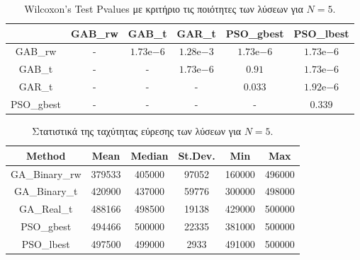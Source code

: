 \documentclass[12pt, a4paper]{article}
\newcommand{\en}{\selectlanguage{english}}
\newcommand{\gr}{\selectlanguage{greek}}
\begin{document}
\begin{table}[H]
	\centering
	\begin{tabular}{| c | c | c | c | c | c |}
		
		\hline
		\en  & \en GAB\_rw & \en GAB\_t & \en GAR\_t & \en PSO\_gbest & \en PSO\_lbest\\
		
		\hline
		\en GAB\_rw & - & $1.73\mathrm{e}{-6}$ & $1.28\mathrm{e}{-3}$ & $1.73\mathrm{e}{-6}$ & $1.73\mathrm{e}{-6}$ \\ 
		
		\hline
		\en GAB\_t & - & - & $1.73\mathrm{e}{-6}$ & $0.91$ & $1.73\mathrm{e}{-6}$ \\ 
		
		\hline
		\en GAR\_t & - & - & - & $0.033$ & $1.92\mathrm{e}{-6}$ \\ 
		
		\hline
		\en PSO\_gbest & - & - & - & - & $0.339$\\ 
		
		\hline
		
	\end{tabular}
	\caption{\en Wilcoxon's Test Pvalues \gr με κριτήριο τις ποιότητες των λύσεων για $N = 5$.}
	\label{tab:sol_qual_pval_N5}
\end{table}

\begin{table}[H]
	\centering
	\begin{tabular}{| c | c | c | c | c | c |}
		
		\hline
		\en Method & \en Mean & \en Median & \en St.Dev. & \en Min & \en Max \\
		
		\hline
		\en GA\_Binary\_rw & 379533 & 405000 & 97052 & 160000 & 496000 \\ 
		
		\hline
		\en GA\_Binary\_t & 420900 & 437000 & 59776 & 300000 & 498000 \\ 
		
		\hline
		\en GA\_Real\_t & 488166 & 498500 & 19138 & 429000 & 500000 \\ 
		
		\hline
		\en PSO\_gbest & 494466 & 500000 & 22335 & 381000 & 500000\\ 
		
		\hline
		\en PSO\_lbest & 497500 & 499000 & 2933 & 491000 & 500000 \\ 
		
		\hline
		
	\end{tabular}
	\caption{Στατιστικά της ταχύτητας εύρεσης των λύσεων για $N = 5$.}
	\label{tab:iter_N5}
\end{table}
\end{document}
